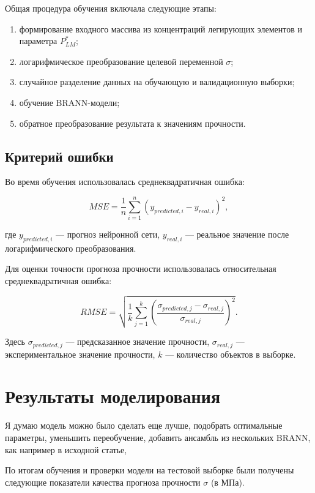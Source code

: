 Общая процедура обучения включала следующие этапы:

\begin{enumerate}
    \item формирование входного массива из концентраций легирующих 
    элементов и параметра $P_{LM}^{*}$;
    \item логарифмическое преобразование целевой переменной $\sigma$;
    \item случайное разделение данных на обучающую и валидационную выборки;
    \item обучение BRANN-модели;
    \item обратное преобразование результата к значениям прочности.
\end{enumerate}

\subsection{Критерий ошибки}

Во время обучения использовалась среднеквадратичная ошибка:

\begin{equation}
MSE =
\frac{1}{n}
\sum_{i=1}^{n}
\left(
y_{predicted,i} - y_{real,i}
\right)^2,
\end{equation}

где $y_{predicted,i}$ --- прогноз нейронной сети, 
$y_{real,i}$ --- реальное значение после логарифмического преобразования.

Для оценки точности прогноза прочности использовалась 
относительная среднеквадратичная ошибка:

\begin{equation}
RMSE =
\sqrt{
\frac{1}{k}
\sum_{j=1}^{k}
\left(
\frac{
\sigma_{predicted,j} - \sigma_{real,j}
}{
\sigma_{real,j}
}
\right)^2
}.
\end{equation}

Здесь $\sigma_{predicted,j}$ --- предсказанное значение прочности, 
$\sigma_{real,j}$ --- экспериментальное значение прочности, 
$k$ --- количество объектов в выборке.


\section{Результаты моделирования}
Я думаю модель можно было сделать еще лучше, подобрать оптимальные параметры, 
уменьшить переобучение, добавить ансамбль из нескольких BRANN, как например в исходной статье, 


По итогам обучения и проверки модели на тестовой выборке были получены следующие показатели качества прогноза прочности $\sigma$ (в МПа).

